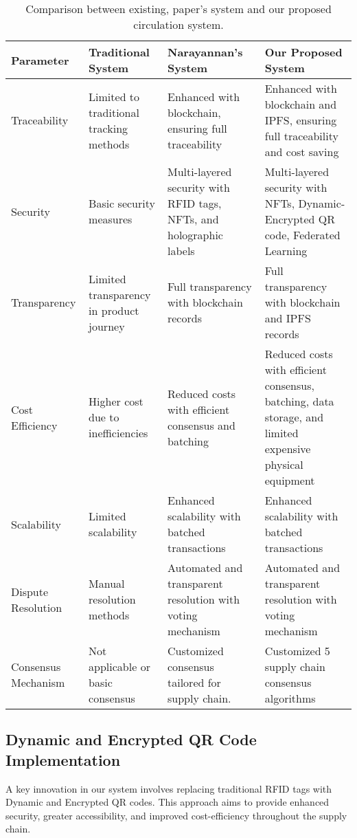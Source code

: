 \documentclass[conference]{IEEEtran}
\begin{document}
\begin{table*}[ht]
\centering
\caption{Comparison between existing, paper's system and our proposed circulation system.}
\label{tab:table2}
\begin{tabular}{|>{\raggedright\arraybackslash}p{3.5cm}|>{\raggedright\arraybackslash}p{3.5cm}|>{\raggedright\arraybackslash}p{3.5cm}|>{\raggedright\arraybackslash}p{3.5cm}|}
\hline
\textbf{Parameter} & \textbf{Traditional System} & \textbf{Narayannan's System} & \textbf{Our Proposed System} \\
\hline
Traceability & Limited to traditional tracking methods & Enhanced with blockchain, ensuring full traceability & Enhanced with blockchain and IPFS, ensuring full traceability and cost saving \\
\hline
Security & Basic security measures & Multi-layered security with RFID tags, NFTs, and holographic labels & Multi-layered security with NFTs, Dynamic-Encrypted QR code, Federated Learning \\
\hline
Transparency & Limited transparency in product journey & Full transparency with blockchain records & Full transparency with blockchain and IPFS records \\
\hline
Cost Efficiency & Higher cost due to inefficiencies & Reduced costs with efficient consensus and batching & Reduced costs with efficient consensus, batching, data storage, and limited expensive physical equipment \\
\hline
Scalability & Limited scalability & Enhanced scalability with batched transactions & Enhanced scalability with batched transactions \\
\hline
Dispute Resolution & Manual resolution methods & Automated and transparent resolution with voting mechanism & Automated and transparent resolution with voting mechanism \\
\hline
Consensus Mechanism & Not applicable or basic consensus & Customized consensus tailored for supply chain. & Customized 5 supply chain consensus algorithms \\
\hline
\end{tabular}
\end{table*}

\subsection{Dynamic and Encrypted QR Code Implementation}

A key innovation in our system involves replacing traditional RFID tags with Dynamic and Encrypted QR codes. This approach aims to provide enhanced security, greater accessibility, and improved cost-efficiency throughout the supply chain.
\end{document}
